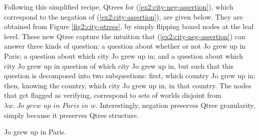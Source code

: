 \begin{exe}
	\label{ex2:qtree-neg-def-leaves}
\end{exe}

Following this simplified recipe, Qtrees for (\ref{ex2:city-neg-assertion}), which correspond to the negation of (\ref{ex2:city-assertion}), are given below. They are obtained from Figure \ref{fig2:city-qtrees}, by simply flipping boxed nodes at the leaf level. These new Qtree capture the intuition that (\ref{ex2:city-neg-assertion}) can answer three kinds of question: a question about whether or not Jo grew up in Paris; a question about which city Jo grew up in; and a question about which city Jo grew up in question of which city Jo grew up in, but such that this question is decomposed into two subquestions: first, which country Jo grew up in; then, knowing the country, which city Jo grew up in, in that country. The nodes that get flagged as verifying, correspond to sets of worlds disjoint from $\lambda w. \ \textit{Jo grew up in Paris in $w$}.$ Interestingly, negation preserves Qtree granularity, simply because it preserves Qtree structure.

\begin{exe}
	 {Jo grew up in Paris.}
	\label{ex2:city-neg-assertion}
\end{exe}


